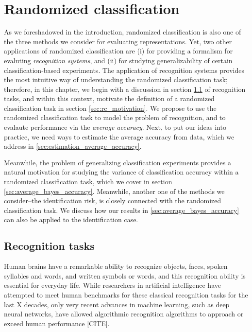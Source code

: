 
\chapter{Randomized classification} %

\label{Chapter2} %

As we foreshadowed in the introduction, randomized classification is
also one of the three methods we consider for evaluating
representations.  Yet, two other applications of randomized
classification are (i) for providing a formalism for evaluting
\emph{recognition systems}, and (ii) for studying generalizability of
certain classification-based experiments.  The application of
recognition systems provides the most intuitive way of understanding
the randomized classification task; therefore, in this chapter, we
begin with a discussion in section \ref{sec:recog_tasks} of
recognition tasks, and within this context, motivate the definition of
a randomized classification task in section \ref{sec:rc_motivation}.
We propose to use the randomized classification task to model the
problem of recognition, and to evalaute performance via the
\emph{average accuracy}.  Next, to put our ideas into practice, we
need ways to estimate the average accuracy from data, which we address
in \ref{sec:estimation_average_accuracy}.

Meanwhile, the problem of generalizing classification experiments
provides a natural motivation for studying the variance of
classification accuracy within a randomized classification task, which
we cover in section \ref{sec:average_bayes_accuracy}.  Meanwhile,
another one of the methods we consider--the identification risk, is
closely connected with the randomized classification task.  We discuss
how our results in \ref{sec:average_bayes_accuracy} can also be
applied to the identification case.

\section{Recognition tasks}\label{sec:recog_tasks}

Human brains have a remarkable ability to recognize objects, faces,
spoken syllables and words, and written symbols or words, and this
recognition ability is essential for everyday life.  While researchers
in artificial intelligence have attempted to meet human benchmarks for
these classical recognition tasks for the last X decades, only very
recent advances in machine learning, such as deep neural networks,
have allowed algorithmic recognition algorithms to approach or exceed
human performance [CITE].

